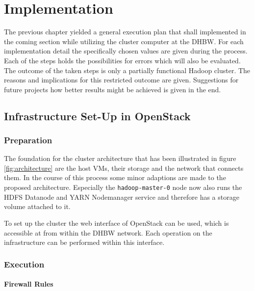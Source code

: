 \chapter{Implementation}
\label{chap:impl}

The previous chapter yielded a general execution plan that shall implemented in the coming 
section while utilizing the cluster computer at the \ac{DHBW}. 
For each implementation detail the specifically chosen values are given during the process. Each of the steps holds 
the possibilities for errors which will also be evaluated.
The outcome of the taken steps is only a partially functional Hadoop cluster.
The reasons and implications for this restricted outcome are given.
Suggestions for future projects how better results might be achieved is given in the end.

\section{Infrastructure Set-Up in OpenStack}

\subsection{Preparation}

The foundation for the cluster architecture that has been illustrated in figure \vref{fig:architecture} are the host \acp{VM}, their storage and the network that connects them.
In the course of this process some minor adaptions are made to the proposed architecture.
Especially the \texttt{hadoop-master-0} node now also runs the \ac{HDFS} Datanode and YARN Nodemanager service and therefore has a storage volume attached to it.

To set up the cluster the web interface of OpenStack can be used, which is accessible at
 from within the \ac{DHBW} network.
Each operation on the infrastructure can be performed within this interface.

\subsection{Execution}

\subsubsection{Firewall Rules}


